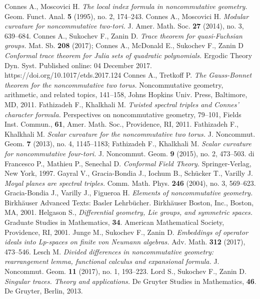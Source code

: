 \documentclass[12pt]{article}
\begin{document}
\begin{thebibliography}{99}
 Connes A., Moscovici H. {\it The local index formula in noncommutative geometry.} Geom. Funct. Anal. {\bf 5} (1995), no. 2, 174--243.
 Connes A., Moscovici H. {\it Modular curvature for noncommutative two-tori.} J. Amer. Math. Soc. {\bf 27} (2014), no. 3, 639--684.
 Connes A., Sukochev F., Zanin D. {\it Trace theorem for quasi-Fuchsian groups.} Mat. Sb. {\bf 208} (2017); Connes A., McDonald E., Sukochev F., Zanin D {\it Conformal trace theorem for Julia sets of quadratic polynomials.} Ergodic Theory Dyn. Syst. Published online: 04 December 2017. https://doi.org/10.1017/etds.2017.124
 Connes A., Tretkoff P. {\it The Gauss-Bonnet theorem for the noncommutative two torus.} Noncommutative geometry, arithmetic, and related topics, 141--158, Johns Hopkins Univ. Press, Baltimore, MD, 2011.
 Fathizadeh F., Khalkhali M. {\it Twisted spectral triples and Connes' character formula.} Perspectives on noncommutative geometry, 79--101, Fields Inst. Commun., {\bf 61}, Amer. Math. Soc., Providence, RI, 2011.
 Fathizadeh F., Khalkhali M. {\it Scalar curvature for the noncommutative two torus.} J. Noncommut. Geom. {\bf 7} (2013), no. 4, 1145--1183; Fathizadeh F., Khalkhali M. {\it Scalar curvature for noncommutative four-tori.} J. Noncommut. Geom. {\bf 9} (2015), no. 2, 473--503.
 di Francesco P., Mathieu P., Senechal D. {\it Conformal Field Theory.} Springer-Verlag, New York, 1997.
 Gayral V., Gracia-Bondia J., Iochum B., Sch\"ucker T., Varilly J. {\it Moyal planes are spectral triples.} Comm. Math. Phys. {\bf 246} (2004), no. 3, 569--623.
 Gracia-Bondia J., Varilly J., Figueroa H. {\it Elements of noncommutative geometry.} Birkh\"auser Advanced Texts: Basler Lehrb\"ucher. Birkh\"auser Boston, Inc., Boston, MA, 2001.
 Helgason S., {\it Differential geometry, Lie groups, and symmetric spaces.} Graduate Studies in Mathematics, {\bf 34}. American Mathematical Society, Providence, RI, 2001.
 Junge M., Sukochev F., Zanin D. {\it Embeddings of operator ideals into Lp-spaces on finite von Neumann algebras.} Adv. Math. {\bf 312} (2017), 473--546.
 Lesch M. {\it Divided differences in noncommutative geometry: rearrangement lemma, functional calculus and expansional formula.} J. Noncommut. Geom. {\bf 11} (2017), no. 1, 193--223.
 Lord S., Sukochev F., Zanin D. {\it Singular traces. Theory and applications.} De Gruyter Studies in Mathematics, {\bf 46}. De Gruyter, Berlin, 2013.

\end{thebibliography}
\end{document}
